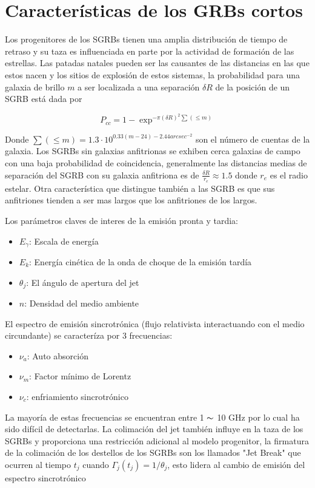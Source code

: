 \documentclass[12pt,a4paper]{book}
\begin{document}
%
\section{Características de los GRBs cortos}
Los progenitores de los SGRBs tienen una amplia distribución de tiempo de retraso y su taza es influenciada en parte por la actividad de formación de las estrellas. Las patadas natales pueden ser las causantes de las distancias en las que estos nacen y los sitios de explosión de estos sistemas, la probabilidad para una galaxia de brillo $m$  a ser localizada a una separación $\delta R$ de la posición de un SGRB está dada por 

\begin{equation}
P_{cc} = 1 - \exp ^{- \pi (\delta R)^{2} \sum(\leq m)}
\end{equation}

Donde $\sum(\leq m) = 1.3\cdot 10^{0.33(m-24)-2.44 arcsec ^{-2}}$ son el número de cuentas de la galaxia. Los SGRBs sin galaxias anfitrionas se exhiben cerca galaxias de campo con una baja probabilidad de coincidencia, generalmente las distancias medias de separación del SGRB con su galaxia anfitriona es de $ \frac{\delta R}{r_e} \approx 1.5$ donde $r_e$ es el radio estelar. Otra característica que distingue también a las SGRB es que sus anfitriones tienden a ser mas largos que los anfitriones de los largos.

Los parámetros claves de interes de la emisión pronta y tardia:
\begin{itemize}
\item $E_{\gamma}$: Escala de energía
\item $E_k$: Energía cinética de la onda de choque de la emisión tardía
\item $\theta_j$: El ángulo de apertura del jet
\item $n$: Densidad del medio ambiente
\end{itemize}

El espectro de emisión sincrotrónica (flujo relativista interactuando con el medio circundante) se caracteríza por 3 frecuencias:
\begin{itemize}
\item $\nu_a$: Auto absorción
\item $\nu_m$: Factor mínimo de Lorentz
\item $\nu_c$: enfriamiento sincrotrónico
\end{itemize}

La mayoría de estas frecuencias se encuentran entre 1 $\thicksim$ 10 GHz por lo cual ha sido difícil de detectarlas. La colimación del jet también influye en la taza de los SGRBs y proporciona una restricción adicional al modelo progenitor, la firmatura de la colimación de los destellos de los SGRBs son los llamados "Jet Break" que ocurren al tiempo $t_j$ cuando $\Gamma_j(t_j) = 1/ \theta_j$, esto lidera al cambio de emisión del espectro sincrotrónico
\end{document}
